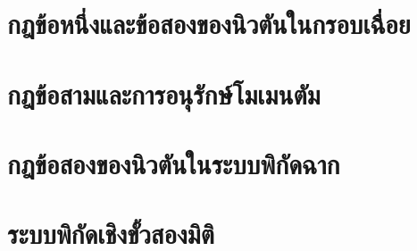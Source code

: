 \section{กฎข้อหนึ่งและข้อสองของนิวตันในกรอบเฉื่อย}
\label{Sec:FirstSecondNewtonLaws}



\section{กฎข้อสามและการอนุรักษ์โมเมนตัม}
\label{Sec:ThirdLawAndMomentumConservation}



\section{กฎข้อสองของนิวตันในระบบพิกัดฉาก}
\label{Sec:SecondNewtonLawInCarCoor}



\section{ระบบพิกัดเชิงขั้วสองมิติ}
\label{Sec:2DPolarCoor}


